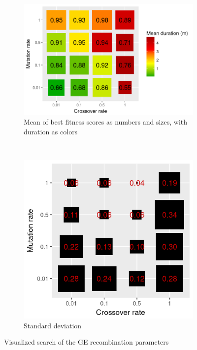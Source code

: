 \begin{figure}
    \centering
    \begin{subfigure}{0.57\textwidth}
        \includegraphics[width=\textwidth]{figures/ge-recombination-sampling}
        \caption{Mean of best fitness scores as numbers and sizes, with duration as colors}
        \label{fig:recombination-sampling}
    \end{subfigure}
    ~
    \begin{subfigure}{0.4\textwidth}
        \includegraphics[width=\textwidth]{figures/ge-recombination-sampling-variance}
        \caption{Standard deviation}
        \label{fig:recombination-sampling-variance}
    \end{subfigure}
    \caption{Visualized search of the GE recombination parameters}
\end{figure}

